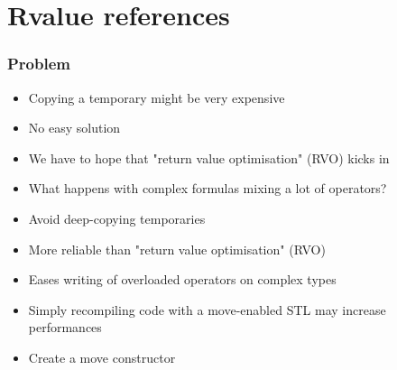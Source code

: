 \documentclass[xcolor=dvipsnames]{beamer}
\begin{document}
\section{Rvalue references}
\begin{frame}[fragile]
  \frametitle{Problem}

  

  \begin{itemize}
    \item Copying a temporary might be very expensive
    \item No easy solution
    \item We have to hope that "return value optimisation" (RVO) kicks in
    \item What happens with complex formulas mixing a lot of operators?
  \end{itemize}
\end{frame}
\begin{frame}[fragile]
  \begin{itemize}
    \item Avoid deep-copying temporaries
    \pause
    \item More reliable than "return value optimisation" (RVO)
    \pause
    \item Eases writing of overloaded operators on complex types
  \end{itemize}

  
  \pause
  \begin{itemize}
    \item Simply recompiling code with a move-enabled STL may increase performances
  \end{itemize}
\end{frame}

\begin{frame}[fragile]
  \begin{itemize}
    \item Create a move constructor
  \end{itemize}

  
\end{frame}
\end{document}
